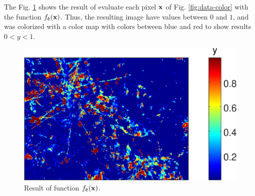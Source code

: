 The Fig. \ref{fig:sigmoid_result} shows the result of evaluate each pixel $\VECTOR{x}$ of Fig. \ref{fig:data-color}
with the function $f_{\VECTOR{\hat{c}}}(\VECTOR{x})$.
Thus, the resulting image have values between $0$ and $1$,
and was colorized with a color map with colors between blue and red 
to show results $0<y<1$.
\begin{figure}[h!]
\centering
\includegraphics[width=0.99\linewidth]{sigmoid_result.png}
\caption{Result of function $f_{\VECTOR{\hat{c}}}(\VECTOR{x})$.}
\label{fig:sigmoid_result}
\end{figure} 
